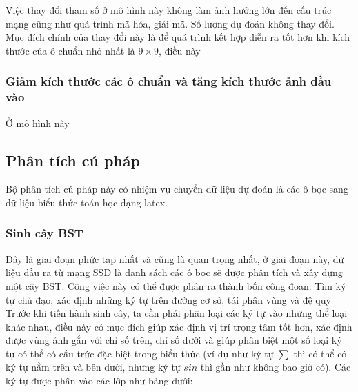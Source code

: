 \documentclass[a4paper,12pt]{article}
\begin{document}
	Việc thay đổi tham số ở mô hình này không làm ảnh hưởng lớn đến cấu trúc mạng cũng như quá trình mã hóa, giải mã. Số lượng dự đoán không thay đổi.\\
	
	Mục đích chính của thay đổi này là để quá trình kết hợp diễn ra tốt hơn khi kích thước của ô chuẩn nhỏ nhất là $9 \times 9$, điều này 
	
	\subsubsection*{Giảm kích thước các ô chuẩn và tăng kích thước ảnh đầu vào}
	
	Ở mô hình này
	
	\subsection{Phân tích cú pháp}
	
	Bộ phân tích cú pháp này có nhiệm vụ chuyển dữ liệu dự đoán là các ô bọc sang dữ liệu biểu thức toán học dạng latex.\\
	
	\subsubsection{Sinh cây BST}
	
	Đây là giai đoạn phức tạp nhất và cũng là quan trọng nhất, ở giai đoạn này, dữ liệu đầu ra từ mạng SSD là danh sách các ô bọc sẽ được phân tích và xây dựng một cây BST. Công việc này có thể được phân ra thành bốn công đoạn: Tìm ký tự chủ đạo, xác định những ký tự trên đường cơ sở, tái phân vùng và đệ quy\\
	
	Trước khi tiến hành sinh cây, ta cần phải phân loại các ký tự vào những thể loại khác nhau, điều này có mục đích giúp xác định vị trí trọng tâm tốt hơn, xác định được vùng ảnh gắn với chỉ số trên, chỉ số dưới và giúp phân biệt một số loại ký tự có thể có cấu trức đặc biệt trong biểu thức (ví dụ như ký tự $\sum$ thì có thể có ký tự nằm trên và bên dưới, nhưng ký tự $sin$ thì gần như không bao giờ có). Các ký tự được phân vào các lớp như bảng dưới:
	
\end{document}
